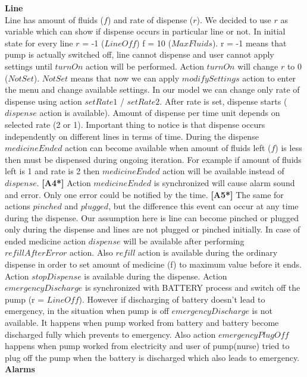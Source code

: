 \documentclass{article}
\begin{document}
\textbf{Line} \\

Line has amount of fluids ($f$) and rate of dispense ($r$). We decided to use $r$ as variable which can show if dispense occurs in particular line or not. In initial state for every line $r$ = -1 ($LineOff$) f = 10 ($MaxFluids$). r = -1 means that pump is actually switched off, line cannot dispense and user cannot apply settings until $turnOn$ action will be performed. Action $turnOn$ will change $r$ to 0 ($NotSet$). $NotSet$ means that now we can apply $modifySettings$ action to enter the menu and change available settings. In our model we can change only rate of dispense using action $setRate1$ / $setRate2$. After rate is set, dispense starts ($dispense$ action is available). Amount of dispense per time unit depends on selected rate (2 or 1). Important thing to notice is that dispense occurs independently on different lines in terms of time. During the dispense $medicineEnded$ action can become available when amount of fluids left ($f$) is less then must be dispensed during ongoing iteration. For example if amount of fluids left is 1 and rate is 2 then $medicineEnded$ action will be available instead of $dispense$. \textbf{[A4*]} Action $medicineEnded$ is synchronized will cause alarm sound and error. Only one error could be notified by the time. \textbf{[A5*]} The same for actions $pinched$ and $plugged$, but the difference this event can occur at any time during the dispense. Our assumption here is line can become pinched or plugged only during the dispense and lines are not plugged or pinched initially. In case of ended medicine action $dispense$ will be available after performing $refillAfterError$ action. Also $refill$ action is available during the ordinary dispense in order to set amount of medicine (f) to maximum value before it ends. Action $stopDispense$ is available during the dispense. Action $emergencyDischarge$ is synchronized with BATTERY process and switch off the pump (r = $LineOff$). However if discharging of battery doesn’t lead to emergency, in the situation when pump is off $emergencyDischarge$ is not available. It happens when pump worked from battery and battery become discharged fully which prevents to emergency. Also action $emergencyPlugOff$ happens when pump worked from electricity and user of pump(nurse) tried to plug off the pump when the battery is discharged which also leads to emergency. \\

\textbf{Alarms} \\
\end{document}

